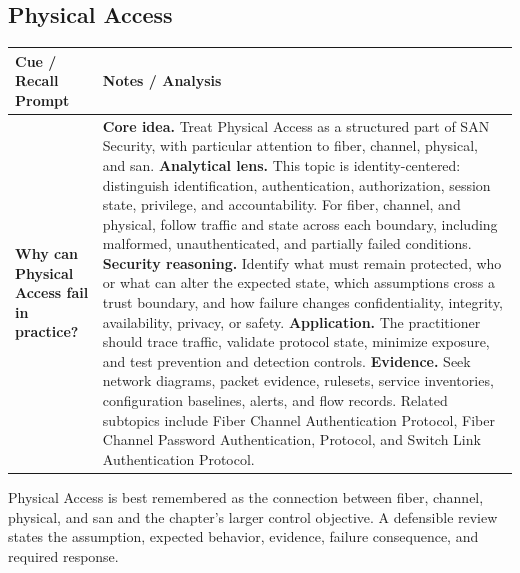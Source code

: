 \documentclass[11pt]{article}
\newcommand{\CornellHeader}{%
\rowcolor{Navy}\color{white}\bfseries Cue / Recall Prompt & \color{white}\bfseries Notes / Analysis\\\hline}
\newcommand{\CornellRow}[2]{%
\cellcolor{CueGray}\RaggedRight\textbf{#1} & \RaggedRight #2\\\hline}
\begin{document}
\subsection*{Physical Access}
\begin{longtable}{>{\RaggedRight\arraybackslash}p{}|>{\RaggedRight\arraybackslash}p{}}
\CornellHeader
\CornellRow{Why can Physical Access fail in practice?}{\textbf{Core idea.} Treat Physical Access as a structured part of SAN Security, with particular attention to fiber, channel, physical, and san. \textbf{Analytical lens.} This topic is identity-centered: distinguish identification, authentication, authorization, session state, privilege, and accountability. For fiber, channel, and physical, follow traffic and state across each boundary, including malformed, unauthenticated, and partially failed conditions. \textbf{Security reasoning.} Identify what must remain protected, who or what can alter the expected state, which assumptions cross a trust boundary, and how failure changes confidentiality, integrity, availability, privacy, or safety. \textbf{Application.} The practitioner should trace traffic, validate protocol state, minimize exposure, and test prevention and detection controls. \textbf{Evidence.} Seek network diagrams, packet evidence, rulesets, service inventories, configuration baselines, alerts, and flow records. Related subtopics include Fiber Channel Authentication Protocol, Fiber Channel Password Authentication, Protocol, and Switch Link Authentication Protocol.}
\end{longtable}
\begin{topicsummary}
Physical Access is best remembered as the connection between fiber, channel, physical, and san and the chapter's larger control objective. A defensible review states the assumption, expected behavior, evidence, failure consequence, and required response.
\end{topicsummary}
\end{document}
